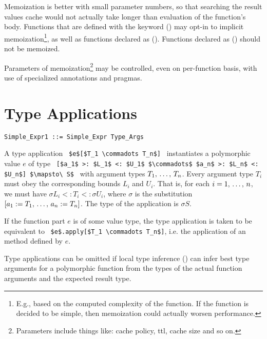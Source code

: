 Memoization is better with small parameter numbers, so that searching the result values cache would not actually take longer than evaluation of the function's body. Functions that are defined with the  keyword () may opt-in to implicit memoization\footnote{E.g., based on the computed complexity of the function. If the function is decided to be simple, then memoization could actually worsen performance.}, as well as functions declared as  (). Functions declared as  () should not be memoized. 

Parameters of memoization\footnote{Parameters include things like: cache policy, ttl, cache size and so on.} may be controlled, even on per-function basis, with use of specialized annotations and pragmas. 





\section{Type Applications}
\label{sec:type-applications}

\syntax\begin{lstlisting}
Simple_Expr1 ::= Simple_Expr Type_Args
\end{lstlisting}

A type application ~\lstinline!$e$[$T_1 \commadots T_n$]!~ instantiates a polymorphic value $e$ of type ~\lstinline![$a_1$ >: $L_1$ <: $U_1$ $\commadots$ $a_n$ >: $L_n$ <: $U_n$] $\mapsto\ S$!~ with argument types $T_1 ,\, \ldots ,\, T_n$. Every argument type $T_i$ must obey the corresponding bounds $L_i$ and $U_i$. That is, for each $i = 1 ,\, \ldots ,\, n$, we must have $\sigma L_i <: T_i <: \sigma U_i$, where $\sigma$ is the substitution $[a_1 := T_1 ,\, \ldots ,\, a_n := T_n]$. The type of the application is $\sigma S$. 

If the function part $e$ is of some value type, the type application is taken to be equivalent to ~\lstinline!$e$.apply[$T_1 \commadots T_n$]!, i.e. the application of an  method defined by $e$. 

Type applications can be omitted if local type inference () can infer best type arguments for a polymorphic function from the types of the actual function arguments and the expected result type. 





